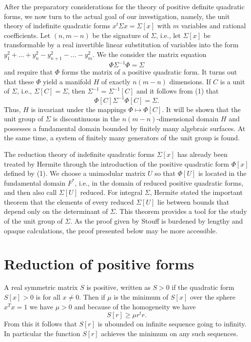 \documentclass[10pt]{amsart}
\begin{document}
After the preparatory considerations for the theory of positive definite quadratic
forms, we now turn to the actual goal of our investigation, namely, the unit theory
of indefinite quadratic forms $x^t\Sigma x = \Sigma[x]$ with $m$ variables and rational
coefficients.
Let $(n, m−n)$ be the signature of $\Sigma$, i.e., let $\Sigma[x]$ be transformable by
a real invertible linear substitution of variables into the form $y_1^2 + \dots + y_n^2 - y_{n+1}^2 - \dots - y_m^2$.
We the consider the matrix equation
\begin{equation*}
\Phi \Sigma^{-1} \Phi = \Sigma
\end{equation*}
and require that $\Phi$ forms the matrix of a positive quadratic form. It turns out that
these $\Phi$ yield a manifold $H$ of exactly $n(m − n)$ dimensions. If $C$ is a unit of $\Sigma$,
i.e., $\Sigma[C] = \Sigma$, then $\Sigma^{-1} = \Sigma^{-1}[C]$ and it follows from (1) that
\begin{equation*}
\Phi[C] \Sigma^{-1} \Phi[C] = \Sigma.
\end{equation*}
Thus, $H$ is invariant under the mappings $\Phi \mapsto \Phi[C]$. It will be shown that
the unit group of $\Sigma$ is discontinuous in the $n(m − n)$-dimensional domain $H$ and
possesses a fundamental domain bounded by finitely many algebraic surfaces. At
the same time, a system of finitely many generators of the unit group is found.

The reduction theory of indefinite quadratic forms $\Sigma[x]$ has already been treated
by Hermite through the introduction of the positive quadratic form $\Phi[x]$ defined by
(1). We choose a unimodular matrix $U$ so that $\Phi[U]$ is located in the fundamental
domain $F^*$, i.e., in the domain of reduced positive quadratic forms, and then also
call $\Sigma[U]$ reduced. For integral $\Sigma$, Hermite stated the important theorem that
the elements of every reduced $\Sigma[U]$ lie between bounds that depend only on the
determinant of $\Sigma$. This theorem provides a tool for the study of the unit group of
$\Sigma$. As the proof given by Stouff is burdened by lengthy and opaque calculations,
the proof presented below may be more accessible.


\section{Reduction of positive forms}

A real symmetric matrix $S$ is positive, written as $S > 0$ if the quadratic form $S[x] > 0$
is for all $x\not= 0$. Then if $\mu$ is the minimum of $S[x]$ over the sphere $x^T x = 1$
we have $\mu > 0$ and because of the homogeneity we have
\begin{equation*}
S[r] \geq \mu r^t r.
\end{equation*}
From this it follows that $S[r]$ is ubounded on infinite sequence going to infinity.
In particular the function $S[r]$ achieves the minimum on any such sequences.









\end{document}

